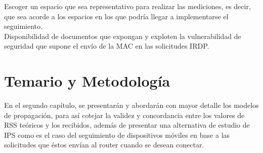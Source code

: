 Escoger un espacio que sea representativo para realizar las mediciones, es decir, que sea acorde a los espacios en los que podría llegar a implementarse el seguimiento.\\
Disponibilidad de documentos que expongan y exploten la vulnerabilidad  de seguridad que supone el envío de la MAC en las solicitudes IRDP.

\section{Temario y Metodología}

En el segundo capítulo, se presentarán y abordarán con mayor detalle los modelos de propagación, para así cotejar la validez y concordancia entre los valores de RSS teóricos y los recibidos, además de presentar una alternativa de estudio de IPS como es el caso del seguimiento de dispositivos móviles en base a las solicitudes que éstos envían al router cuando se desean conectar. 